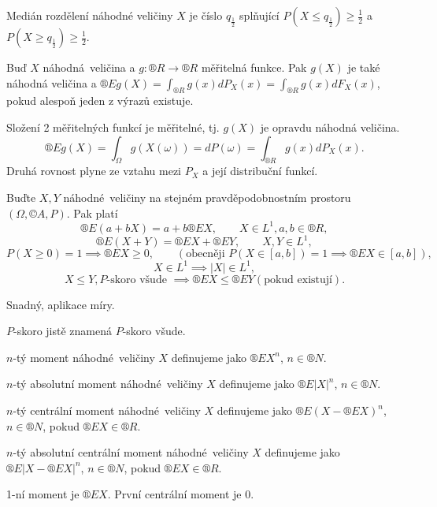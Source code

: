 \documentclass[12pt]{article}					%
\begin{document}
\begin{definice}[Medián]
	Medián rozdělení náhodné veličiny $X$ je číslo $q_{\frac{1}{2}}$ splňující $P(X ≤ q_{\frac{1}{2}}) ≥ \frac{1}{2}$ a $P(X ≥ q_{\frac{1}{2}}) ≥ \frac{1}{2}$.
\end{definice}


\begin{veta}
	Buď $X$ náhodná veličina a $g: ®R \rightarrow ®R$ měřitelná funkce. Pak $g(X)$ je také náhodná veličina a $®E g(X) = \int_{®R} g(x) d P_X(x) = \int_{®R} g(x) dF_X(x)$, pokud alespoň jeden z výrazů existuje.

	\begin{dukazin}
		Složení 2 měřitelných funkcí je měřitelné, tj. $g(X)$ je opravdu náhodná veličina.
		$$ ®E g(X) = \int_{\Omega} g(X(\omega)) = d P(\omega) = \int_{®R} g(x) d P_X(x). $$
		Druhá rovnost plyne ze vztahu mezi $P_X$ a její distribuční funkcí.
	\end{dukazin}
\end{veta}

\begin{veta}
	Buďte $X, Y$ náhodné veličiny na stejném pravděpodobnostním prostoru $(\Omega, ©A, P)$. Pak platí
	$$ ®E(a + bX) = a + b ®E X,\qquad X \in L^1, a, b \in ®R, $$
	$$ ®E(X + Y) = ®E X + ®E Y, \qquad X, Y \in L^1, $$
	$$ P(X ≥ 0)  = 1 \implies ®E X ≥ 0, \qquad (\text{obecněji } P(X \in [a, b]) = 1 \implies ®E X \in [a, b]), $$
	$$ X \in L^1 \implies |X| \in L^1, $$
	$$ X ≤ Y, P\text{-skoro všude } \implies ®E X ≤ ®E Y (\text{pokud existují}). $$

	\begin{dukazin}
		Snadný, aplikace míry.
	\end{dukazin}
\end{veta}

\begin{definice}
	$P$-skoro jistě znamená $P$-skoro všude.
\end{definice}

\begin{definice}[$n-tý$ moment]
	$n$-tý moment náhodné veličiny $X$ definujeme jako $®E X^n$, $n \in ®N$.

	$n$-tý absolutní moment náhodné veličiny $X$ definujeme jako $®E |X|^n$, $n \in ®N$.
	
	$n$-tý centrální moment náhodné veličiny $X$ definujeme jako $®E (X - ®E X)^n$, $n \in ®N$, pokud $®E X \in ®R$.
	
	$n$-tý absolutní centrální moment náhodné veličiny $X$ definujeme jako $®E |X - ®E X|^n$, $n \in ®N$, pokud $®E X \in ®R$.

	\begin{poznamkain}
		1-ní moment je $®E X$. První centrální moment je 0.
	\end{poznamkain}
\end{definice}
\end{document}
